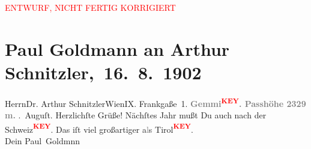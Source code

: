 
\begin{center}
            \textcolor{red}{ENTWURF, NICHT FERTIG KORRIGIERT}
                      \end{center}
            
         \renewcommand{\erwaehnteOrte}{Orte: Frankgasse, Leukerbad, Wien}
         \renewcommand{\erwaehnteWerke}{}
               \section[ Paul Goldmann an Arthur Schnitzler, 16. 8. 1902]{ Paul Goldmann an Arthur Schnitzler, 16. 8. 1902}\nopagebreak{}\rehead{ }\begin{ledgroupsized}[t]{13cm}\normalsize\beginnumbering \toendnotes[C]{\smallbreak\pagebreak[2]} 
\pstart{}{\pb}Herrn\pend{}\pstart{}Dr. Arthur Schnitzler\pend{}\pstart{}Wien\pend{}\pstart{}IX. Frankgaße 1.\pend{}{\bigskip}\pstart
           \noindent{}{\pb}\textcolor{gray}{\textbf{Gemmi\textcolor{red}{\textsuperscript{\textbf{KEY}}}. Passhöhe 2329 m.}}\pend
           . Auguſt.\pend
           \pstart
           Herzlichſte Grüße! Nächſtes Jahr mußt Du auch nach der Schweiz\textcolor{red}{\textsuperscript{\textbf{KEY}}}. Das iſt viel großartiger a\textcolor{gray}{l}s Tirol\textcolor{red}{\textsuperscript{\textbf{KEY}}}. {\\}Dein \spacefill\mbox{Paul Goldmnn }\pend
           
         
         \endnumbering{}\end{ledgroupsized}\begin{anhang}\end{anhang}\newcommand{\dateiname}{L03220}\newcommand{\titel}{Paul Goldmann an Arthur Schnitzler, 16. 8. 1902}\newcommand{\editorInnen}{Martin Anton Müller und Laura Untner}
      